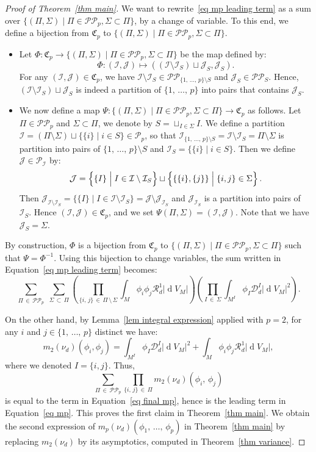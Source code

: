\documentclass[AHL,Unicode,longabstracts,published]{cedram}
\DeclareMathOperator{\dmesure}{d}
\newcommand{\D}{\mathcal{D}}
\newcommand{\I}{\mathcal{I}}
\newcommand{\J}{\mathcal{J}}
\newcommand{\clR}{\mathcal{R}}
\newcommand{\frkC}{\mathfrak{C}}
\newcommand{\pa}{\mathcal{P}\!}
\newcommand{\pp}{\mathcal{P\!P}\!}
\newcommand{\mvert}{\mathrel{}\middle|\mathrel{}}
\newcommand{\norm}[1]{\left\lvert #1 \right\rvert}
\newcommand{\rmes}[1]{\norm{\dmesure\! V_{#1}}}
\begin{document}
\begin{proof}[{Proof of Theorem~\ref{thm main}}]
We want to rewrite~\eqref{eq mp leading term} as a sum over $\{(\Pi,\Sigma) \mid \Pi \in \pp_p, \Sigma \subset \Pi\}$, by a change of variable. To this end, we define a bijection from $\frkC_p$ to $\{(\Pi,\Sigma) \mid \Pi \in \pp_p, \Sigma \subset \Pi\}$.
\begin{itemize}
\item Let $\Phi:\frkC_p \to \{(\Pi,\Sigma) \mid \Pi \in \pp_p, \Sigma \subset \Pi\}$ be the map defined by:
\[
\Phi:(\I,\J) \mapsto \left(\left(\I \setminus \I_S\right) \sqcup \J_S, \J_S\right).
\]
For any $(\I,\J) \in \frkC_p$, we have $\I \setminus \I_S \in \pp_{\{1,\,\dots,\,p\} \setminus S}$ and $\J_S \in \pp_S$. Hence, $(\I \setminus \I_S) \sqcup \J_S$ is indeed a partition of $\{1,\,\dots,\,p\}$ into pairs that contains $\J_S$.
\item We now define a map $\Psi:\{(\Pi,\Sigma) \mid \Pi \in \pp_p, \Sigma \subset \Pi\} \to \frkC_p$ as follows. Let $\Pi \in \pp_p$ and $\Sigma \subset \Pi$, we denote by $S = \sqcup_{I \in \Sigma} I$. We define a partition $\I = (\Pi \setminus \Sigma) \sqcup \{\{i\} \mid i \in S\} \in \pa_p$, so that $\I_{\{1,\,\dots,\,p\} \setminus S} = \I \setminus \I_S = \Pi \setminus \Sigma$ is partition into pairs of $\{1,\,\dots,\,p\} \setminus S$ and $\I_S = \{\{i\} \mid i \in S\}$. Then we define $\J \in \pa_\I$ by:
\[
\J = \left\{\rule{0em}{2.5ex} \{I\} \mvert I \in \I \setminus \I_S\right\} \sqcup \left\{\rule{0em}{2.5ex} \{\{i\},\{j\}\} \mvert \{i,j\} \in \Sigma\right\}.
\]
Then $\J_{\I \setminus \I_S} = \{\{I\} \mid I \in \I \setminus \I_S\} = \J \setminus \J_{\I_S}$ and $\J_{\I_S}$ is a partition into pairs of $\I_S$. Hence $(\I,\J) \in \frkC_p$, and we set $\Psi(\Pi,\Sigma)=(\I,\J)$. Note that we have $\J_S = \Sigma$.
\end{itemize}
By construction, $\Phi$ is a bijection from $\frkC_p$ to $\{(\Pi,\Sigma) \mid \Pi \in \pp_p, \Sigma \subset \Pi\}$ such that $\Psi = \Phi^{-1}$. Using this bijection to change variables, the sum written in Equation~\eqref{eq mp leading term} becomes:
\begin{equation}\label{eq final mp}
\sum_{\Pi\,\in\,\pp_p}\;\sum_{\Sigma\,\subset\,\Pi} \left(\prod_{\{i,\,j\}\,\in\,\Pi\,\setminus\,\Sigma} \int_M \phi_i\phi_j\clR^1_d \rmes{M}\right)\left(\prod_{I\,\in\,\Sigma} \int_{M^I} \phi_I \D_d^I \rmes{M}^2 \right).
\end{equation}

On the other hand, by Lemma~\ref{lem integral expression} applied with $p=2$, for any $i$ and $j \in \{1,\,\dots,\,p\}$ distinct we have:
\[
m_2(\nu_d)\left(\phi_i,\phi_j\right) =\int_{M^I} \phi_I \D_d^I \rmes{M}^2 + \int_M \phi_i\phi_j \clR^1_d \rmes{M},
\]
where we denoted $I = \{i,j\}$. Thus,
\[
\sum_{\Pi\,\in\,\pp_p} \prod_{\{i,\,j\}\,\in\,\Pi} m_2(\nu_d)\left(\phi_i,\,\phi_j\right)
\]
is equal to the term in Equation~\eqref{eq final mp}, hence is the leading term in Equation~\eqref{eq mp}. This proves the first claim in Theorem~\ref{thm main}. We obtain the second expression of $m_p(\nu_d)(\phi_1,\,\dots,\,\phi_p)$ in Theorem~\ref{thm main} by replacing $m_2(\nu_d)$ by its asymptotics, computed in Theorem~\ref{thm variance}.


\end{proof}
\end{document}

